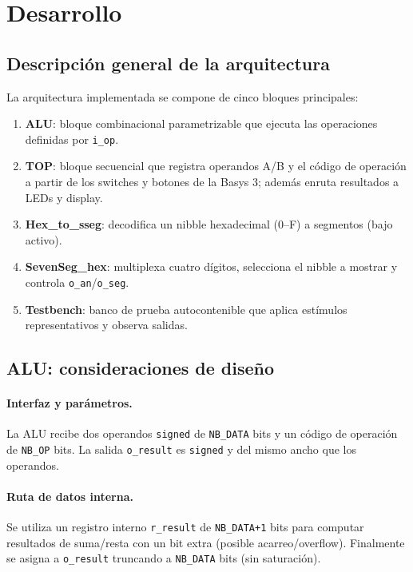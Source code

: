 \section{Desarrollo}

\subsection{Descripción general de la arquitectura}
La arquitectura implementada se compone de cinco bloques principales:
\begin{enumerate}
    \item \textbf{ALU}: bloque combinacional parametrizable que ejecuta las operaciones definidas por \texttt{i\_op}.
    \item \textbf{TOP}: bloque secuencial que registra operandos A/B y el código de operación a partir de los switches y botones de la Basys 3; además enruta resultados a LEDs y display.
    \item \textbf{Hex\_to\_sseg}: decodifica un nibble hexadecimal (0--F) a segmentos (bajo activo).
    \item \textbf{SevenSeg\_hex}: multiplexa cuatro dígitos, selecciona el nibble a mostrar y controla \texttt{o\_an}/\texttt{o\_seg}.
    \item \textbf{Testbench}: banco de prueba autocontenible que aplica estímulos representativos y observa salidas.
\end{enumerate}

\subsection{ALU: consideraciones de diseño}
\paragraph{Interfaz y parámetros.}
La ALU recibe dos operandos \texttt{signed} de \texttt{NB\_DATA} bits y un código de operación de \texttt{NB\_OP} bits. La salida \texttt{o\_result} es \texttt{signed} y del mismo ancho que los operandos.

\paragraph{Ruta de datos interna.}
Se utiliza un registro interno \texttt{r\_result} de \texttt{NB\_DATA+1} bits para computar resultados de suma/resta con un bit extra (posible acarreo/overflow). Finalmente se asigna a \texttt{o\_result} truncando a \texttt{NB\_DATA} bits (sin saturación).


